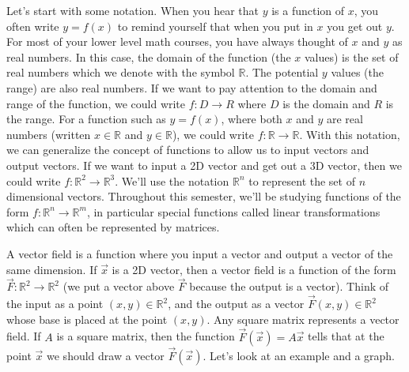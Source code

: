 Let's start with some notation. 
When you hear that $y$ is a function of $x$, you often write $y=f(x)$ to remind yourself that when you put in $x$ you get out $y$. 
For most of your lower level math courses, you have always thought of $x$ and $y$ as real numbers. 
In this case, the domain of the function (the $x$ values) is the set of real numbers which we denote with the symbol $\mathbb{R}$.  
The potential $y$ values (the range) are also real numbers.  
If we want to pay attention to the domain and range of the function, we could write $f:D\to R$  where $D$ is the domain and $R$ is the range.  
For a function such as $y=f(x)$, where both $x$ and $y$ are real numbers (written $x\in \mathbb{R}$ and $y\in \mathbb{R}$), we could write $f:{\mathbb{R}}\to{\mathbb{R}}$. 
With this notation, we can generalize the concept of functions to allow us to input vectors and output vectors.  
If we want to input a 2D vector and get out a 3D vector, then we could write $f:{\mathbb{R}}^2\to{\mathbb{R}}^3$.  
We'll use the notation ${\mathbb{R}}^n$ to represent the set of $n$ dimensional vectors. 
Throughout this semester, we'll be studying functions of the form $f:{\mathbb{R}}^n\to {\mathbb{R}}^m$, in particular special functions called linear transformations which can often be represented by matrices.

A vector field is a function where you input a vector and output a vector of the same dimension. 
If $\vec x$ is a 2D vector, then a vector field is a function of the form $\vec F:{\mathbb{R}}^2\to {\mathbb{R}}^2$ (we put a vector above $\vec F$ because the output is a vector).  Think of the input as a point $(x,y)\in {\mathbb{R}}^2$, and the output as a vector $\vec F(x,y)\in {\mathbb{R}}^2$ whose base is placed at the point $(x,y)$.
Any square matrix represents a vector field.  If $A$ is a square matrix, then the function $\vec F(\vec x) = A\vec x$ tells that at the point $\vec x$ we should draw a vector $\vec F(\vec x)$. Let's look at an example and a graph.


